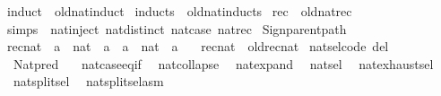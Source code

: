 \begin{isabellebody}
\ induct\ {\isacharequal}{\kern0pt}\ old{\isachardot}{\kern0pt}nat{\isachardot}{\kern0pt}induct\isanewline
{}\isamarkupfalse%
\ inducts\ {\isacharequal}{\kern0pt}\ old{\isachardot}{\kern0pt}nat{\isachardot}{\kern0pt}inducts\isanewline
{}\isamarkupfalse%
\ rec\ {\isacharequal}{\kern0pt}\ old{\isachardot}{\kern0pt}nat{\isachardot}{\kern0pt}rec\isanewline
{}\isamarkupfalse%
\ simps\ {\isacharequal}{\kern0pt}\ nat{\isachardot}{\kern0pt}inject\ nat{\isachardot}{\kern0pt}distinct\ nat{\isachardot}{\kern0pt}case\ nat{\isachardot}{\kern0pt}rec\isanewline
%
\isadelimML
\isanewline
%
\endisadelimML
%
\isatagML
{}\isamarkupfalse%
\ {\isacartoucheopen}Sign{\isachardot}{\kern0pt}parent{\isacharunderscore}{\kern0pt}path{\isacartoucheclose}%
\endisatagML
{\isafoldML}%
%
\isadelimML
\isanewline
%
\endisadelimML
\isanewline
{}\isamarkupfalse%
\ rec{\isacharunderscore}{\kern0pt}nat\ {\isacharcolon}{\kern0pt}{\isacharcolon}{\kern0pt}\ {\isachardoublequoteopen}{\isacharprime}{\kern0pt}a\ {\isasymRightarrow}\ {\isacharparenleft}{\kern0pt}nat\ {\isasymRightarrow}\ {\isacharprime}{\kern0pt}a\ {\isasymRightarrow}\ {\isacharprime}{\kern0pt}a{\isacharparenright}{\kern0pt}\ {\isasymRightarrow}\ nat\ {\isasymRightarrow}\ {\isacharprime}{\kern0pt}a{\isachardoublequoteclose}\isanewline
\ \ \ {\isachardoublequoteopen}rec{\isacharunderscore}{\kern0pt}nat\ {\isasymequiv}\ old{\isachardot}{\kern0pt}rec{\isacharunderscore}{\kern0pt}nat{\isachardoublequoteclose}\isanewline
\isanewline
{}\isamarkupfalse%
\ nat{\isachardot}{\kern0pt}sel{\isacharbrackleft}{\kern0pt}code\ del{\isacharbrackright}{\kern0pt}\isanewline
\isanewline
{}\isamarkupfalse%
\ {\isacharparenleft}{\kern0pt}\ Nat{\isachardot}{\kern0pt}pred\ %
\isanewline
{}\isamarkupfalse%
\isanewline
\ \ nat{\isachardot}{\kern0pt}case{\isacharunderscore}{\kern0pt}eq{\isacharunderscore}{\kern0pt}if\isanewline
\ \ nat{\isachardot}{\kern0pt}collapse\isanewline
\ \ nat{\isachardot}{\kern0pt}expand\isanewline
\ \ nat{\isachardot}{\kern0pt}sel\isanewline
\ \ nat{\isachardot}{\kern0pt}exhaust{\isacharunderscore}{\kern0pt}sel\isanewline
\ \ nat{\isachardot}{\kern0pt}split{\isacharunderscore}{\kern0pt}sel\isanewline
\ \ nat{\isachardot}{\kern0pt}split{\isacharunderscore}{\kern0pt}sel{\isacharunderscore}{\kern0pt}asm\isanewline

\end{isabellebody}
